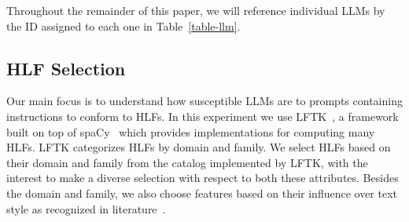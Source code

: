 \documentclass[a4paper,twoside]{article}
\begin{document}
\begin{table}[ht!]
    \setlength\tabcolsep{6pt}
    \centering
    \caption{Large Language Model Selection}\label{table-llm}
\end{table}

Throughout the remainder of this paper, we will reference individual LLMs by the
ID assigned to each one in Table~\ref{table-llm}.

\subsection{HLF Selection}\label{hlf-selection}

Our main focus is to understand how susceptible LLMs are to prompts containing
instructions to conform to HLFs.
In this experiment we use LFTK~\cite{lftk-2023}, a framework built on top of
spaCy~\cite{spacy} which provides implementations for computing many HLFs.
LFTK categorizes HLFs by domain and family.
We select HLFs based on their domain and family from the catalog implemented by
LFTK, with the interest to make a diverse selection with respect to both
these attributes.
Besides the domain and family, we also choose features based on their influence
over text style as recognized in literature~\cite{verma2019lexical,lugea2023stylistics}.
\end{document}
